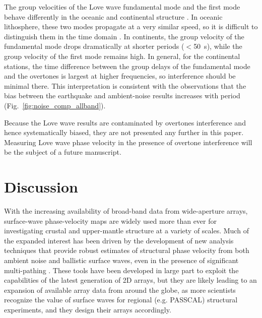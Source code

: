 The group velocities of the Love wave fundamental mode and the first mode behave differently in the oceanic and continental structure \citep{Nettles:2011bb}. In oceanic lithosphere, these two modes propagate at a very similar speed, so it is difficult to distinguish them in the time domain \cite{Gaherty:1996uf} . In continents, the group velocity of the fundamental mode drops dramatically at shorter periods ($<$50~s), while the group velocity of the first mode remains high. In general, for the continental stations, the time difference between the group delays of the fundamental mode and the overtones is largest at higher frequencies, so interference should be minimal there. 
This interpretation is consistent with the observations that the bias between the earthquake and ambient-noise results increases with period (Fig.~\ref{fig:noise_comp_allband}).



Because the Love wave results are contaminated by overtones interference and hence systematically biased, they are not presented any further in this paper. Measuring Love wave phase velocity in the presence of overtone interference will be the subject of a future manuscript.

\section{Discussion}
\label{sec:discussion}

With the increasing availability of broad-band data from wide-aperture arrays, surface-wave phase-velocity maps are widely used more than ever for investigating crustal and upper-mantle structure at a variety of scales. Much of the expanded interest has been driven by the development of new analysis techniques that provide robust estimates of structural phase velocity from both ambient noise \citep[e.g.,][]{Ekstrom:2013dr} and ballistic surface waves, even in the presence of significant multi-pathing \citep[e.g.,][]{Forsyth:2005id, Lin:2011fw}. These tools have been developed in large part to exploit the capabilities of the latest generation of 2D arrays, but they are likely leading to an expansion of available array data from around the globe, as more scientists recognize the value of surface waves for regional (e.g. PASSCAL) structural experiments, and they design their arrays accordingly.  


